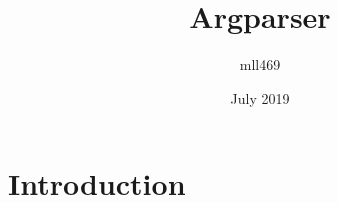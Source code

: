 \documentclass{article}
\title{Argparser}
\author{mll469 }
\date{July 2019}
\begin{document}
\maketitle

\section{Introduction}
\end{document}
